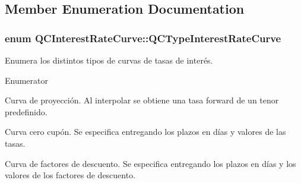 \subsection{Member Enumeration Documentation}
\hypertarget{class_q_c_interest_rate_curve_a68e2145ab0bc68344bcfcdfaf592fb63}{
\subsubsection[{Q\+C\+Type\+Interest\+Rate\+Curve}]{\setlength{\rightskip}{0pt plus 5cm}enum {\bf Q\+C\+Interest\+Rate\+Curve\+::\+Q\+C\+Type\+Interest\+Rate\+Curve}}}\label{class_q_c_interest_rate_curve_a68e2145ab0bc68344bcfcdfaf592fb63}
Enumera los distintos tipos de curvas de tasas de interés. \begin{Desc}
\item[Enumerator]\par
\begin{description}
\item[{\em 
\hypertarget{class_q_c_interest_rate_curve_a68e2145ab0bc68344bcfcdfaf592fb63a877e81812e983cf935de5f225d025305}{qc\+Projecting\+Curve}\label{class_q_c_interest_rate_curve_a68e2145ab0bc68344bcfcdfaf592fb63a877e81812e983cf935de5f225d025305}
}]Curva de proyección. Al interpolar se obtiene una tasa forward de un tenor predefinido. \item[{\em 
\hypertarget{class_q_c_interest_rate_curve_a68e2145ab0bc68344bcfcdfaf592fb63a22386a704b2c20f8fe7e4b4461cbc22d}{qc\+Zero\+Coupon\+Curve}\label{class_q_c_interest_rate_curve_a68e2145ab0bc68344bcfcdfaf592fb63a22386a704b2c20f8fe7e4b4461cbc22d}
}]Curva cero cupón. Se especifica entregando los plazos en días y valores de las tasas. \item[{\em 
\hypertarget{class_q_c_interest_rate_curve_a68e2145ab0bc68344bcfcdfaf592fb63a37f65bba40528ce332c6c24825e8ba17}{qc\+Discount\+Factor\+Curve}\label{class_q_c_interest_rate_curve_a68e2145ab0bc68344bcfcdfaf592fb63a37f65bba40528ce332c6c24825e8ba17}
}]Curva de factores de descuento. Se especifica entregando los plazos en días y los valores de los factores de descuento. \end{description}
\end{Desc}


